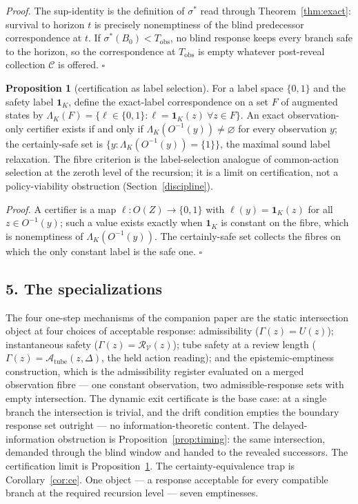 \documentclass[10pt,twocolumn]{article}
\theoremstyle{definition}
\newtheorem{proposition}{Proposition}
\begin{document}
\emph{Proof.} The sup-identity is the definition of \(\sigma^{*}\) read
through Theorem~\ref{thm:exact}: survival to horizon \(t\) is precisely
nonemptiness of the blind predecessor correspondence at \(t\). If
\(\sigma^{*}(B_0) < T_{\mathrm{obs}}\), no blind response keeps every branch
safe to the horizon, so the correspondence at \(T_{\mathrm{obs}}\) is empty
whatever post-reveal collection \(\mathscr{C}\) is offered. \hfill\(\square\)

\begin{proposition}[certification as label selection]\label{prop:label}
For a label space \(\{0,1\}\) and the safety label
\(\mathbf{1}_{K}\), define the exact-label correspondence on a set \(F\) of
augmented states by
\(\Lambda_{K}(F) = \{ \ell \in \{0,1\} : \ell = \mathbf{1}_{K}(z)\ \forall z
\in F \}\). An exact observation-only certifier exists if and only if
\(\Lambda_{K}(O^{-1}(y)) \neq \varnothing\) for every observation \(y\); the
certainly-safe set is \(\{ y : \Lambda_{K}(O^{-1}(y)) = \{1\} \}\), the
maximal sound label relaxation. The fibre criterion is the label-selection
analogue of common-action selection at the zeroth level of the recursion;
it is a limit on certification, not a policy-viability obstruction
(Section~\ref{discipline}).
\end{proposition}

\emph{Proof.} A certifier is a map \(\ell: O(Z) \to \{0,1\}\) with
\(\ell(y) = \mathbf{1}_{K}(z)\) for all \(z \in O^{-1}(y)\); such a value
exists exactly when \(\mathbf{1}_{K}\) is constant on the fibre, which is
nonemptiness of \(\Lambda_{K}(O^{-1}(y))\). The certainly-safe set collects
the fibres on which the only constant label is the safe one.
\hfill\(\square\)

\subsection{5. The specializations}\label{specializations}

The four one-step mechanisms of the companion paper are the static
intersection object at four choices of acceptable response: admissibility
(\(\Gamma(z) = U(z)\)); instantaneous safety
(\(\Gamma(z) = \mathcal{R}_{\mathcal{V}}(z)\)); tube safety at a review
length (\(\Gamma(z) = \mathcal{A}_{\mathrm{tube}}(z, \Delta)\), the held
action reading); and the epistemic-emptiness construction, which is the
admissibility register evaluated on a merged observation fibre --- one
constant observation, two admissible-response sets with empty intersection.
The dynamic exit certificate is the base case: at a single branch the
intersection is trivial, and the drift condition empties the boundary
response set outright --- no information-theoretic content. The delayed-information
obstruction is Proposition~\ref{prop:timing}: the same intersection,
demanded through the blind window and handed to the revealed successors.
The certification limit is Proposition~\ref{prop:label}. The
certainty-equivalence trap is Corollary~\ref{cor:ce}. One object --- a
response acceptable for every compatible branch at the required recursion
level --- seven emptinesses.
\end{document}
